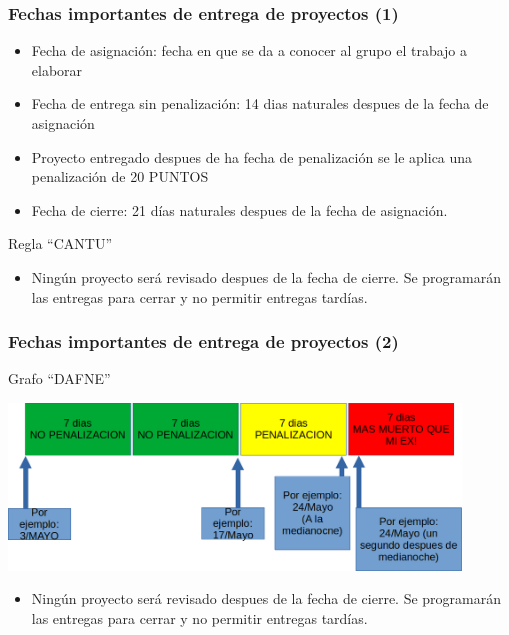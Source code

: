 
\begin{frame}
\frametitle{Fechas importantes de entrega de proyectos (1)}

\begin{itemize}
\item Fecha de asignación: fecha en que se da a conocer al grupo el trabajo a elaborar
\item Fecha de entrega sin penalización: 14 dias naturales despues de la fecha de asignación
\item Proyecto entregado despues de ha fecha de penalización se le aplica una penalización de 20 PUNTOS
\item Fecha de cierre: 21 días naturales despues de la fecha de asignación. 
\end{itemize}
\begin{block}{Regla ``CANTU''}
\begin{itemize}
\item Ningún proyecto será revisado despues de la fecha de cierre. Se programarán las entregas para cerrar y no permitir entregas tardías. 
\end{itemize}
\end{block}
\end{frame}

\begin{frame}
\frametitle{Fechas importantes de entrega de proyectos (2)}
\begin{block}{Grafo ``DAFNE''}
\begin{center}
\includegraphics[width=12cm]{FechasEntrega/Grafo_Fechas.png}
\end{center}
\begin{itemize}
\item Ningún proyecto será revisado despues de la fecha de cierre. Se programarán las entregas para cerrar y no permitir entregas tardías. 
\end{itemize}
\end{block}

\end{frame}



